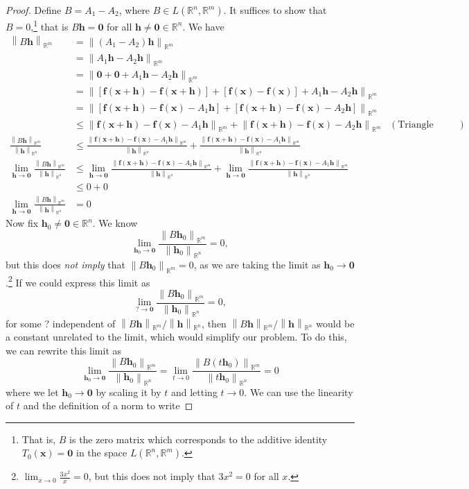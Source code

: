 \documentclass{article}
\newcommand{\R}{\mathbb{R}}
\newcommand{\x}{\mathbf{x}}
\newcommand{\f}{\mathbf{f}}
\newcommand{\h}{\mathbf{h}}
\newcommand{\ze}{\mathbf{0}}
\newcommand{\norm}[1]{\left\lVert#1\right\rVert}
\theoremstyle{definition}
\begin{document}
\begin{proof}
	Define $ B = A_1 - A_2 $, where $ B\in L(\R^n,\R^m) $. It suffices to show that $ B = 0 $,\footnote{That is, $ B $ is the zero matrix which corresponds to the additive identity $ T_0(\x)=\ze $ in the space $ L(\R^n,\R^m) $. } that is $ B\h = \ze $ for all $ \h\neq\ze\in \R^n $. We have 
	\begin{align*}
		\norm{B\h}_{\R^m} &= \norm{(A_1 - A_2)\h}_{\R^m}\\
		& = \norm{ A_1\h -  A_2\h}_{\R^m}\\ 
		& = \norm{ \ze + \ze + A_1\h -  A_2\h}_{\R^m} \\
		& = \norm{ \left[\f(\x+\h) - \f(\x+\h)\right] +\left[\f(\x) - \f(\x)\right] + A_1\h -  A_2\h}_{\R^m} \\
		& = \norm{ \left[\f(\x+\h) - \f(\x) - A_1\h \right] +\left[\f(\x+\h) - \f(\x) - A_2\h \right]}_{\R^m}\\
		& \le \norm{\f(\x+\h) - \f(\x) - A_1\h}_{\R^m} +  \norm{\f(\x+\h) - \f(\x) - A_2\h}_{\R^m} & (\text{Triangle Inequality})
			\\\frac{\norm{B\h}_{\R^m}}{\norm{\h}_{\R^n}} & \le \frac{\norm{\f(\x+\h) - \f(\x) - A_1\h}_{\R^m} }{\norm{\h}_{\R^n}} + \frac{\norm{\f(\x+\h) - \f(\x) - A_1\h}_{\R^m} }{\norm{\h}_{\R^n}}	\\ 	\lim\limits_{\mathbf h\to \ze}\frac{\norm{B\h}_{\R^m}}{\norm{\h}_{\R^n}} & \le 	\lim\limits_{\mathbf h\to \ze}\frac{\norm{\f(\x+\h) - \f(\x) - A_1\h}_{\R^m} }{\norm{\h}_{\R^n}} + 	\lim\limits_{\mathbf h\to \ze}\frac{\norm{\f(\x+\h) - \f(\x) - A_1\h}_{\R^m} }{\norm{\h}_{\R^n}}\\ & \le 0 + 0 \\\lim\limits_{\mathbf h\to \ze}\frac{\norm{B\h}_{\R^m}}{\norm{\h}_{\R^n}}& = 0
	\end{align*}
Now fix $ \h_0\neq \ze \in \R^n $. We know $$ \lim\limits_{\mathbf h_0\to \ze}\frac{\norm{B\h_0}_{\R^m}}{\norm{\h_0}_{\R^n}}= 0,$$ but this does \textit{not imply} that $ \norm{B\h_0}_{\R^m} = 0 $, as we are taking the limit as $\mathbf h_0\to\ze$.\footnote{$ \lim_{x\to0}\frac{3x^2}{x}=0 $, but this does not imply that $ 3x^2 = 0 $ for all $ x $. } If we could express this limit as 
$$ \lim\limits_{?\to \ze}\frac{\norm{B\h_0}_{\R^m}}{\norm{\h_0}_{\R^n}}= 0,$$ for some ? independent of ${\norm{ B\h}_{\R^m}}/{\norm{\h}_{\R^n}}$, then ${\norm{ B\h}_{\R^m}}/{\norm{\h}_{\R^n}}$ would be a constant unrelated to the limit, which would simplify our problem. To do this, we can rewrite this limit as 
$$\lim\limits_{\mathbf h_0\to \ze}\frac{\norm{B\h_0}_{\R^m}}{\norm{\h_0}_{\R^n}}= \lim\limits_{t\to 0}\frac{\norm{B(t\h_0)}_{\R^m}}{\norm{t\h_0}_{\R^n}} = 0$$ where we let $ \h_0\to\ze $ by scaling it by $ t $ and letting $ t\to 0 $. We can use the linearity of $ t $ and the definition of a norm to write 

\end{proof}
\end{document}
